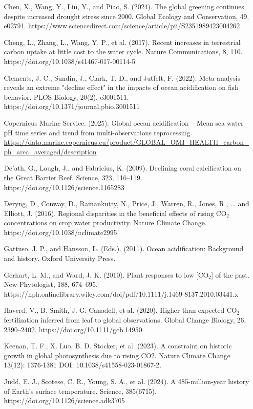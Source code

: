 \documentclass[12pt,paper=a4,DIV=12,parskip=never,chapterprefix=false,headings=standardclasses]{scrreprt}
\begin{document}
Chen, X., Wang, Y., Liu, Y., and Piao, S. (2024). The global greening continues despite increased drought stress since 2000. Global Ecology and Conservation, 49, e02791. https://www.sciencedirect.com/science/article/pii/S2351989423004262

Cheng, L., Zhang, L., Wang, Y. P., et al. (2017). Recent increases in terrestrial carbon uptake at little cost to the water cycle. Nature Communications, 8, 110. https://doi.org/10.1038/s41467-017-00114-5

Clements, J. C., Sundin, J., Clark, T. D., and Jutfelt, F. (2022). Meta-analysis reveals an extreme "decline effect" in the impacts of ocean acidification on fish behavior. PLOS Biology, 20(2), e3001511. https://doi.org/10.1371/journal.pbio.3001511

Copernicus Marine Service. (2025). Global ocean acidification – Mean sea water pH time series and trend from multi-observations reprocessing. \url{https://data.marine.copernicus.eu/product/GLOBAL_OMI_HEALTH_carbon_ph_area_averaged/description}

De'ath, G., Lough, J., and Fabricius, K. (2009). Declining coral calcification on the Great Barrier Reef. Science, 323, 116–119. https://doi.org/10.1126/science.1165283

Deryng, D., Conway, D., Ramankutty, N., Price, J., Warren, R., Jones, R., ... and Elliott, J. (2016). Regional disparities in the beneficial effects of rising CO$_2$ concentrations on crop water productivity. Nature Climate Change. https://doi.org/10.1038/nclimate2995

Gattuso, J. P., and Hansson, L. (Eds.). (2011). Ocean acidification: Background and history. Oxford University Press.

Gerhart, L. M., and Ward, J. K. (2010). Plant responses to low [CO$_2$] of the past. New Phytologist, 188, 674–695. https://nph.onlinelibrary.wiley.com/doi/pdf/10.1111/j.1469-8137.2010.03441.x

Haverd, V., B. Smith, J. G. Canadell, et al. (2020). Higher than expected CO$_2$ fertilization inferred from leaf to global observations. Global Change Biology, 26, 2390–2402. https://doi.org/10.1111/gcb.14950

Keenan, T. F., X. Luo, B. D. Stocker, et al. (2023). A constraint on historic growth in global photosynthesis due to rising CO2. Nature Climate Change 13(12): 1376-1381 DOI: 10.1038/s41558-023-01867-2.

Judd, E. J., Scotese, C. R., Young, S. A., et al. (2024). A 485-million-year history of Earth's surface temperature. Science, 385(6715). https://doi.org/10.1126/science.adk3705
\end{document}
